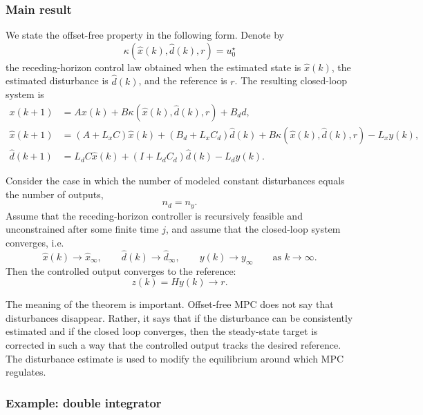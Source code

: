 \subsubsection{Main result}

We state the offset-free property in the following form. Denote by
\[
    \kappa(\hat x(k),\hat d(k),r)=u_0^\star
\]
the receding-horizon control law obtained when the estimated state is \(\hat x(k)\), the estimated
disturbance is \(\hat d(k)\), and the reference is \(r\). The resulting closed-loop system is
\[
\begin{aligned}
    x(k+1) &=
    Ax(k)+B\kappa(\hat x(k),\hat d(k),r)+B_d d,\\
    \hat x(k+1) &=
    (A+L_xC)\hat x(k)
    +(B_d+L_xC_d)\hat d(k)
    +B\kappa(\hat x(k),\hat d(k),r)
    -L_x y(k),\\
    \hat d(k+1) &=
    L_dC\hat x(k)
    +(I+L_dC_d)\hat d(k)
    -L_dy(k).
\end{aligned}
\]

\begin{theorembox}
Consider the case in which the number of modeled constant disturbances equals the number of
outputs,
\[
    n_d=n_y.
\]
Assume that the receding-horizon controller is recursively feasible and unconstrained after
some finite time \(j\), and assume that the closed-loop system converges, i.e.
\[
    \hat x(k)\to \hat x_\infty,\qquad
    \hat d(k)\to \hat d_\infty,\qquad
    y(k)\to y_\infty
    \qquad \text{as } k\to\infty.
\]
Then the controlled output converges to the reference:
\[
    z(k)=Hy(k)\to r.
\]
\end{theorembox}

The meaning of the theorem is important. Offset-free MPC does not say that disturbances
disappear. Rather, it says that if the disturbance can be consistently estimated and if the closed
loop converges, then the steady-state target is corrected in such a way that the controlled output
tracks the desired reference. The disturbance estimate is used to modify the equilibrium around
which MPC regulates.

\subsubsection{Example: double integrator}

